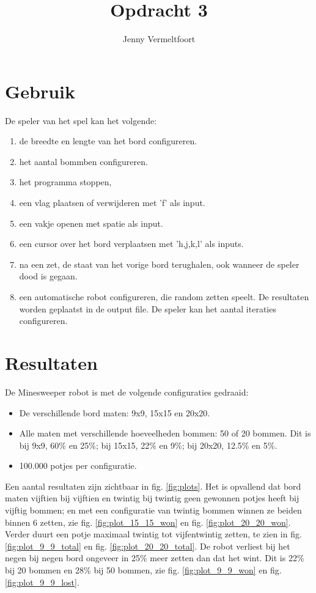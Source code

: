 \documentclass[10pt]{article}
\title{Opdracht 3}
\author{Jenny Vermeltfoort}
\begin{document}
\def\tablename{Tabel}

\maketitle

\section{Gebruik}

De speler van het spel kan het volgende:
\begin{enumerate}
  \item de breedte en lengte van het bord configureren.
  \item het aantal bommben configureren.
  \item het programma stoppen,
  \item een vlag plaatsen of verwijderen met 'f' als input.
  \item een vakje openen met spatie als input.
  \item een cursor over het bord verplaatsen met 'h,j,k,l' als inputs.
  \item na een zet, de staat van het vorige bord terughalen, ook wanneer de speler dood is gegaan.
  \item een automatische robot configureren, die random zetten speelt. De resultaten worden geplaatst in de output
        file. De speler kan het aantal iteraties configureren.
\end{enumerate}

\section{Resultaten}
De Minesweeper robot is met de volgende configuraties gedraaid:
\begin{itemize}
  \item De verschillende bord maten: 9x9, 15x15 en 20x20.
  \item Alle maten met verschillende hoeveelheden bommen: 50 of 20 bommen. Dit is bij 9x9,
        60\% en 25\%; bij 15x15, 22\% en 9\%; bij 20x20, 12.5\% en 5\%.
  \item 100.000 potjes per configuratie.
\end{itemize}

Een aantal resultaten zijn zichtbaar in fig. \ref{fig:plots}. Het is opvallend dat bord maten vijftien bij vijftien en
twintig bij twintig geen
gewonnen potjes heeft bij vijftig bommen; en met een configuratie van twintig bommen winnen ze beiden binnen 6 zetten,
zie
fig. \ref{fig:plot_15_15_won} en fig. \ref{fig:plot_20_20_won}. Verder duurt een potje maximaal twintig tot
vijfentwintig zetten, te
zien in fig. \ref{fig:plot_9_9_total} en fig. \ref{fig:plot_20_20_total}. De robot verliest bij het negen bij negen
bord ongeveer in 25\%  meer
zetten dan dat het wint. Dit is 22\% bij 20 bommen en 28\% bij 50 bommen, zie fig. \ref{fig:plot_9_9_won} en fig.
\ref{fig:plot_9_9_lost}.
\end{document}
